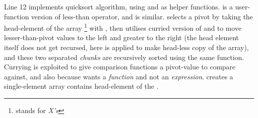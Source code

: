 Line 12 implements quicksort algorithm, using  and  as helper functions.  is a user-function version of less-than operator, and  is similar.  selects a pivot by taking the head-element of the array \footnote{stands for \emph{X's}} with , then utilises curried version of  and  to move lesser-than-pivot values to the left and greater to the right (the head element itself does not get recursed, here  is applied to make head-less copy of the array), and these two separated \emph{chunks} are recursively sorted using the same  function. Currying is exploited to give comparison functions a pivot-value to compare against, and also because  wants a \emph{function} and not an \emph{expression}.  creates a single-element array contains head-element of the .

